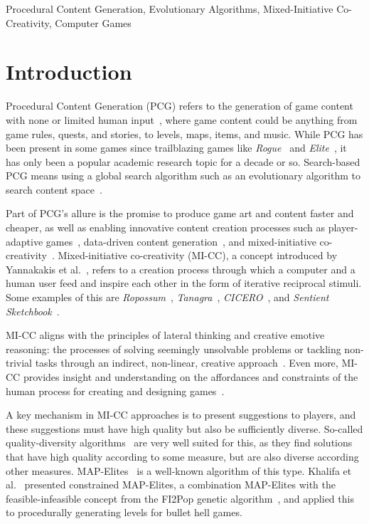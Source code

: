 \documentclass[conference]{IEEEtran}
\begin{document}
\begin{IEEEkeywords}
Procedural Content Generation, Evolutionary Algorithms, Mixed-Initiative Co-Creativity, Computer Games
\end{IEEEkeywords}

\section{Introduction}

Procedural Content Generation (PCG) refers to the generation of game content with none or limited human input~\cite{Yannakakis2018}, where game content could be anything from game rules, quests, and stories, to levels, maps, items, and music. While PCG has been present in some games since trailblazing games like \emph{Rogue}~\cite{michael_toy_1980} and \emph{Elite}~\cite{braben_elite_1984}, it has only been a popular academic research topic for a decade or so. Search-based PCG means using a global search algorithm such as an evolutionary algorithm to search content space~\cite{Togelius2011}.

Part of PCG's allure is the promise to produce game art and content faster and cheaper, as well as enabling innovative content creation processes such as player-adaptive games~\cite{shaker2012evolving, hastings_evolving_2009, dormansUnexplored2017}, data-driven content generation~\cite{Khalifa2018, Green2018}, and mixed-initiative co-creativity~\cite{Liapis2014}. Mixed-initiative co-creativity (MI-CC), a concept introduced by Yannakakis et al.~\cite{yannakakis2014micc}, refers to a creation process through which a computer and a human user feed and inspire each other in the form of iterative reciprocal stimuli. Some examples of this are \textit{Ropossum}~\cite{shaker2013ropossum}, \textit{Tanagra}~\cite{smith_tanagra:_2011}, \textit{CICERO}~\cite{Machado2017}, and \textit{Sentient Sketchbook}~\cite{liapis_generating_2013}. 

MI-CC aligns with the principles of lateral thinking and creative emotive reasoning: the processes of solving seemingly unsolvable problems or tackling non-trivial tasks through an indirect, non-linear, creative approach~\cite{Liapis2016}. Even more, MI-CC provides insight and understanding on the affordances and constraints of the human process for creating and designing games~\cite{Yannakakis2018}.

A key mechanism in MI-CC approaches is to present suggestions to players, and these suggestions must have high quality but also be sufficiently diverse. So-called quality-diversity algorithms~\cite{Pugh2016} are very well suited for this, as they find solutions that have high quality according to some measure, but are also diverse according other measures. MAP-Elites~\cite{Mouret2015} is a well-known algorithm of this type. Khalifa et al.~\cite{Khalifa2018} presented constrained MAP-Elites, a combination MAP-Elites with the feasible-infeasible concept from the FI2Pop genetic algorithm~\cite{Kimbrough2008}, and applied this to procedurally generating levels for bullet hell games.
\end{document}
